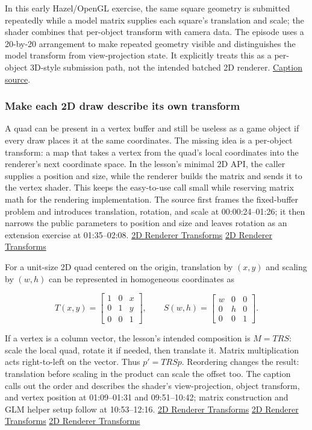 In this early Hazel/OpenGL exercise, the same square geometry is submitted repeatedly while a model matrix supplies each square's translation and scale; the shader combines that per-object transform with camera data. The episode uses a 20-by-20 arrangement to make repeated geometry visible and distinguishes the model transform from view-projection state. It explicitly treats this as a per-object 3D-style submission path, not the intended batched 2D renderer. \href{https://www.youtube.com/watch?v=cbB2fh0UxZ0}{Caption source}.

\subsubsection{Make each 2D draw describe its own transform}\label{make-each-2d-draw-describe-its-own-transform}

A quad can be present in a vertex buffer and still be useless as a game object if every draw places it at the same coordinates. The missing idea is a per-object transform: a map that takes a vertex from the quad's local coordinates into the renderer's next coordinate space. In the lesson's minimal 2D API, the caller supplies a position and size, while the renderer builds the matrix and sends it to the vertex shader. This keeps the easy-to-use call small while reserving matrix math for the rendering implementation. The source first frames the fixed-buffer problem and introduces translation, rotation, and scale at 00:00:24--01:26; it then narrows the public parameters to position and size and leaves rotation as an extension exercise at 01:35--02:08. \href{https://www.youtube.com/watch?v=-Qt12lcAF0Y&t=24s}{2D Renderer Transforms} \href{https://www.youtube.com/watch?v=-Qt12lcAF0Y&t=95s}{2D Renderer Transforms}

For a unit-size 2D quad centered on the origin, translation by \((x,y)\) and scaling by \((w,h)\) can be represented in homogeneous coordinates as

\[
T(x,y)=\begin{bmatrix}1&0&x\\0&1&y\\0&0&1\end{bmatrix},\qquad
S(w,h)=\begin{bmatrix}w&0&0\\0&h&0\\0&0&1\end{bmatrix}.
\]

If a vertex is a column vector, the lesson's intended composition is \(M=TRS\): scale the local quad, rotate it if needed, then translate it. Matrix multiplication acts right-to-left on the vector. Thus \(p'=TRSp\). Reordering changes the result: translation before scaling in the product can scale the offset too. The caption calls out the order and describes the shader's view-projection, object transform, and vertex position at 01:09--01:31 and 09:51--10:42; matrix construction and GLM helper setup follow at 10:53--12:16. \href{https://www.youtube.com/watch?v=-Qt12lcAF0Y&t=69s}{2D Renderer Transforms} \href{https://www.youtube.com/watch?v=-Qt12lcAF0Y&t=591s}{2D Renderer Transforms} \href{https://www.youtube.com/watch?v=-Qt12lcAF0Y&t=653s}{2D Renderer Transforms}

